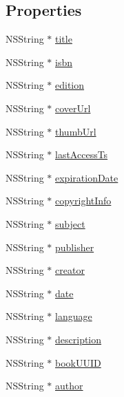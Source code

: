 \subsection*{Properties}
\begin{DoxyCompactItemize}
\item 
N\-S\-String $\ast$ \hyperlink{interface_pxe_player_book_a7b90d0569e28b2c8a548ce58fdd78089}{title}
\item 
N\-S\-String $\ast$ \hyperlink{interface_pxe_player_book_ad6112557a3413f32dae81ca61db34840}{isbn}
\item 
N\-S\-String $\ast$ \hyperlink{interface_pxe_player_book_a218bf45943504045b908b7c438b994f0}{edition}
\item 
N\-S\-String $\ast$ \hyperlink{interface_pxe_player_book_ac76f59149fa39a3e4eb15cfcf289c2dd}{cover\-Url}
\item 
N\-S\-String $\ast$ \hyperlink{interface_pxe_player_book_a1396e4a5a219032f3482ab1556797790}{thumb\-Url}
\item 
N\-S\-String $\ast$ \hyperlink{interface_pxe_player_book_ae185e74c9aac16d5d592aeba1111defb}{last\-Access\-Ts}
\item 
N\-S\-String $\ast$ \hyperlink{interface_pxe_player_book_a6ac644b4bfb5a693764b81454c10ee0a}{expiration\-Date}
\item 
N\-S\-String $\ast$ \hyperlink{interface_pxe_player_book_aca64d2186c8e621147758cdc0f53245b}{copyright\-Info}
\item 
N\-S\-String $\ast$ \hyperlink{interface_pxe_player_book_a96ae409bbcb6826fb23457e188b658fd}{subject}
\item 
N\-S\-String $\ast$ \hyperlink{interface_pxe_player_book_a10d22f7a9625bb431db977410093dc7b}{publisher}
\item 
N\-S\-String $\ast$ \hyperlink{interface_pxe_player_book_ab9a69b163da02700afe3466551e03c8a}{creator}
\item 
N\-S\-String $\ast$ \hyperlink{interface_pxe_player_book_ad8a2e06c55f191348773ee7b7e2ca3d9}{date}
\item 
N\-S\-String $\ast$ \hyperlink{interface_pxe_player_book_a2fd2a2d7a8761a35377955b5ef9683eb}{language}
\item 
N\-S\-String $\ast$ \hyperlink{interface_pxe_player_book_aa673b642a388b3ebde37ccaf03cc7ad4}{description}
\item 
N\-S\-String $\ast$ \hyperlink{interface_pxe_player_book_aebb4a95ecf0dd74f70abe6c234171d4b}{book\-U\-U\-I\-D}
\item 
N\-S\-String $\ast$ \hyperlink{interface_pxe_player_book_a1ddad2064600a6239eb5dc4e007d2e7c}{author}

\end{DoxyCompactItemize}
